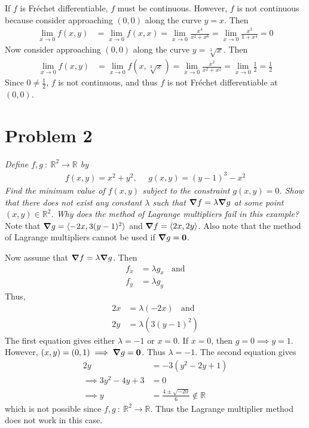 \documentclass[12pt]{article}
\theoremstyle{plain}
\begin{document}
If $f$ is Fr\'{e}chet differentiable, $f$ must be continuous.  However, $f$ is not continuous because consider approaching $(0,0)$ along the curve $y = x$.  Then
\begin{align*}
    \lim_{x\rightarrow 0} f(x,y) &= \lim_{x\rightarrow 0} f(x,x) = \lim_{x \rightarrow 0} \frac{x^4}{x^2 + x^6} = \lim_{x\rightarrow 0} \frac{x^2}{1 + x^4} = 0
\end{align*}
Now consider approaching $(0, 0)$ along the curve $y = \sqrt[3]{x}$.  Then
\begin{align*}
    \lim_{x\rightarrow 0} f(x,y) &= \lim_{x\rightarrow 0} f(x,\sqrt[3]{x}) = \lim_{x \rightarrow 0} \frac{x^2}{x^2 + x^2} = \lim_{x \rightarrow 0} \frac{1}{2} = \frac{1}{2}
\end{align*}
Since $0 \neq \frac{1}{2}$, $f$ is not continuous, and thus $f$ is not Fr\'{e}chet differentiable at $(0, 0)$.

\section*{Problem 2}
\textit{Define $f,g\ :\ \mathbb{R}^2 \rightarrow \mathbb{R}$ by}
\begin{align*}
    f(x,y) = x^2 + y^2,\ \ \ \ \ \ g(x,y) = (y-1)^3 - x^2
\end{align*}
\textit{Find the minimum value of $f(x,y)$ subject to the constraint $g(x,y) = 0$.  Show that there does not exist any constant $\lambda$ such that $\grad f = \lambda \grad g$ at some point $(x,y) \in \mathbb{R}^2$.  Why does the method of Lagrange multipliers fail in this example?} \\

Note that $\grad g = \langle -2x, 3(y - 1)^2 \rangle$ and $\grad f = \langle 2x, 2y \rangle$.  Also note that the method of Lagrange multipliers cannot be used if $\grad g = \textbf{0}$.

Now assume that $\grad f = \lambda \grad g$.  Then
\begin{align*}
    f_x &= \lambda g_x\ \ \ \ \text{and} \\
    f_y &= \lambda g_y
\end{align*}
Thus,
\begin{align*}
    2x &= \lambda(-2x) \ \ \ \ \text{and} \\
    2y &= \lambda(3(y - 1)^2)
\end{align*}
The first equation gives either $\lambda = -1$ or $x = 0$.  If $x = 0$, then $g = 0 \implies y = 1$.  However, $(x,y) = (0,1) \implies \grad g = \textbf{0}$.  Thus $\lambda = -1$.  The second equation gives
\begin{align*}
    2y &= -3(y^2 - 2y + 1) \\
    \implies 3y^2 - 4y + 3 &= 0 \\
    \implies y &= \frac{4 \pm \sqrt{-20}}{6} \not\in \mathbb{R}
\end{align*}
which is not possible since $f,g\ :\ \mathbb{R}^2 \rightarrow \mathbb{R}$.  Thus the Lagrange multiplier method does not work in this case.
\end{document}
